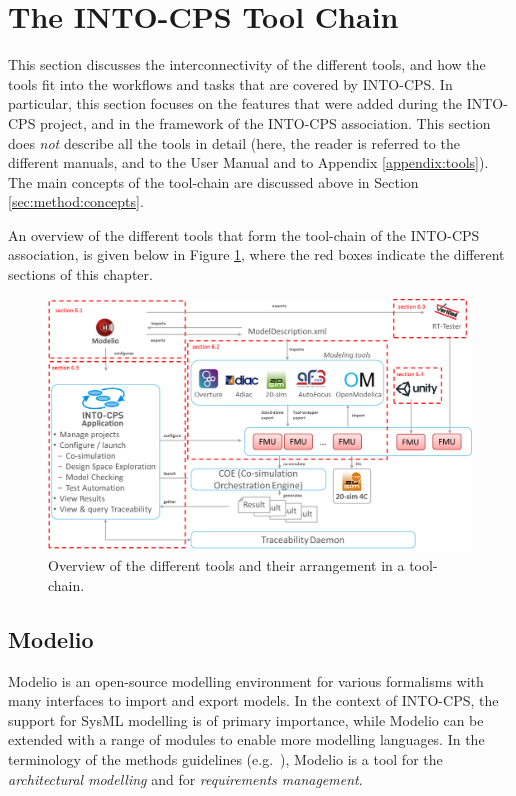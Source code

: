 
\section{The INTO-CPS Tool Chain}\label{sec:toolchain}

This section discusses the interconnectivity of the different tools, and how the tools fit into the workflows and tasks that are covered by INTO-CPS. In particular, this section focuses on the features that were added during the INTO-CPS project, and in the framework of the INTO-CPS association. This section does \textit{not} describe all the tools in detail (here, the reader is referred to the different manuals, and to the User Manual \cite{INTOCPSD4.3a} and to Appendix \ref{appendix:tools}). The main concepts of the tool-chain are discussed above in Section \ref{sec:method:concepts}.

An overview of the different tools that form the tool-chain of the INTO-CPS association, is given below in Figure \ref{fig:fulltool-chain}, where the red boxes indicate the different sections of this chapter.

\begin{figure}[!ht]
	\centering
		\includegraphics[width=0.9 \textwidth]{./figures/toolchain_association}
	\caption{Overview of the different tools and their arrangement in a tool-chain.}
	\label{fig:fulltool-chain}
\end{figure}

\subsection{Modelio}
\label{sec:modelio}
Modelio is an open-source modelling environment for various formalisms with many interfaces to import and export models. In the context of INTO-CPS, the support for SysML modelling is of primary importance, while Modelio can be extended with a range of modules to enable more modelling languages. In the terminology of the methods guidelines (e.g.\ \cite{Pierce&18}), Modelio is a tool for the \textit{architectural modelling} and for \textit{requirements management}.

